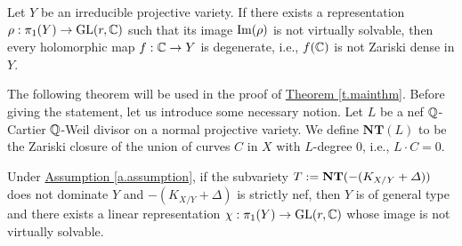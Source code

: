 \begin{lemme}
	\label{l.degenerencyentirecurve}
	Let $Y$ be an irreducible projective variety. If there exists a representation $\rho:\pi_1(Y)\rightarrow \GL(r,\CC)$ such that its image $\Image(\rho)$ is not virtually solvable, then every holomorphic map $f:\CC\rightarrow Y$ is degenerate, i.e., $f(\CC)$ is not Zariski dense in $Y$.
\end{lemme}

The following theorem will be used in the proof of {\hyperref[t.mainthm]{Theorem \ref*{t.mainthm}}}. 
Before giving the statement, let us introduce some necessary notion. Let $L$ be a nef $\QQ$-Cartier $\QQ$-Weil divisor on a normal projective variety. We define $\textbf{NT}(L)$ to be the Zariski closure of the union of curves $C$ in $X$ with $L$-degree $0$, i.e., $L\cdot C=0$.

\begin{thm}
	\label{t.generaltype}
	Under {\hyperref[a.assumption]{Assumption \ref*{a.assumption}}}, if the subvariety $T:=\textrm{\bf NT}(-(K_{X/Y}+\Delta))$ does not dominate $Y$ and $-(K_{X/Y}+\Delta)$ is strictly nef, then $Y$ is of general type and there exists a linear representation $\chi:\pi_1(Y)\rightarrow \GL(r,\CC)$ whose image is not virtually solvable.
\end{thm}

